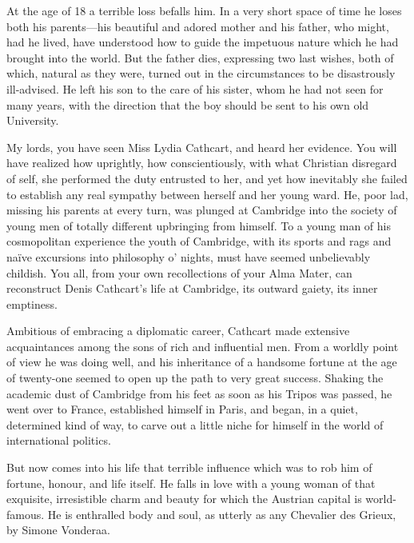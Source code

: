 \begin{dialogue}
\smallskip 

At the age of 18 a terrible loss befalls him. In a very short space of time he loses both his parents—his beautiful and adored mother and his father, who might, had he lived, have understood how to guide the impetuous nature which he had brought into the world. But the father dies, expressing two last wishes, both of which, natural as they were, turned out in the circumstances to be disastrously ill-advised. He left his son to the care of his sister, whom he had not seen for many years, with the direction that the boy should be sent to his own old University.

\smallskip 

My lords, you have seen Miss Lydia Cathcart, and heard her evidence. You will have realized how uprightly, how conscientiously, with what Christian disregard of self, she performed the duty entrusted to her, and yet how inevitably she failed to establish any real sympathy between herself and her young ward. He, poor lad, missing his parents at every turn, was plunged at Cambridge into the society of young men of totally different upbringing from himself. To a young man of his cosmopolitan experience the youth of Cambridge, with its sports and rags and naïve excursions into philosophy o' nights, must have seemed unbelievably childish. You all, from your own recollections of your Alma Mater, can reconstruct Denis Cathcart's life at Cambridge, its outward gaiety, its inner emptiness.

\smallskip 

Ambitious of embracing a diplomatic career, Cathcart made extensive acquaintances among the sons of rich and influential men. From a worldly point of view he was doing well, and his inheritance of a handsome fortune at the age of twenty-one seemed to open up the path to very great success. Shaking the academic dust of Cambridge from his feet as soon as his Tripos was passed, he went over to France, established himself in Paris, and began, in a quiet, determined kind of way, to carve out a little niche for himself in the world of international politics.

\smallskip 

But now comes into his life that terrible influence which was to rob him of fortune, honour, and life itself. He falls in love with a young woman of that exquisite, irresistible charm and beauty for which the Austrian capital is world-famous. He is enthralled body and soul, as utterly as any Chevalier des Grieux, by Simone Vonderaa.


\end{dialogue}
